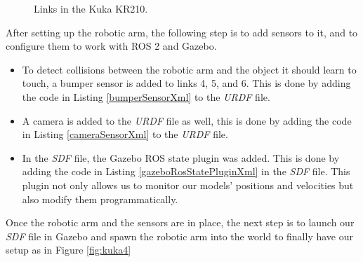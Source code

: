 \documentclass[12pt,oneside]{article}
\begin{document}
\begin{figure}[H]
  \centering
  \hfill
  \caption{Links in the Kuka KR210.}
\end{figure}

After setting up the robotic arm, the following step is to add sensors to it, and to configure them to work with ROS 2 and Gazebo.
\begin{itemize}
\item To detect collisions between the robotic arm and the object it should learn to touch, a bumper sensor is added to links 4, 5, and 6. This is done by adding the code in Listing \ref{bumperSensorXml} to the \textit{URDF} file.

\item A camera is added to the \textit{URDF} file as well, this is done by adding the code in Listing \ref{cameraSensorXml} to the \textit{URDF} file.

\item In the \textit{SDF} file, the Gazebo ROS state plugin was added. This is done by adding the code in Listing \ref{gazeboRosStatePluginXml} in the \textit{SDF} file. This plugin not only allows us to monitor our models' positions and velocities but also modify them programmatically.
\end{itemize}

Once the robotic arm and the sensors are in place, the next step is to launch our \textit{SDF} file in Gazebo and spawn the robotic arm into the world to finally have our setup as in Figure \ref{fig:kuka4}
\end{document}
